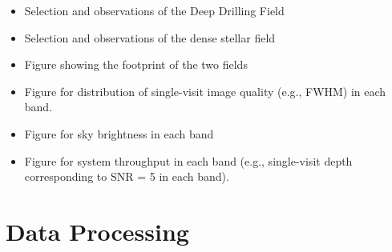 \begin{itemize}

\item Selection and observations of the Deep Drilling Field

\item Selection and observations of the dense stellar field

\item Figure showing the footprint of the two fields

\item Figure for distribution of single-visit image quality (e.g., FWHM) in each band.

\item Figure for sky brightness in each band 

\item Figure for system throughput in each band (e.g., single-visit depth corresponding to SNR = 5 in each band).

\end{itemize}








\section{Data Processing}

